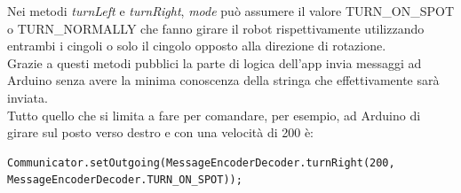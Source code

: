 Nei metodi \emph{turnLeft} e \emph{turnRight}, \emph{mode} può assumere il valore 
TURN\_ON\_SPOT o TURN\_NORMALLY che fanno girare il robot rispettivamente utilizzando 
entrambi i cingoli o solo il cingolo opposto alla direzione di rotazione.\\
Grazie a questi metodi pubblici la parte di logica dell'app invia messaggi ad Arduino
senza avere la minima conoscenza della stringa che effettivamente sarà inviata.\\
Tutto quello che si limita a fare per comandare, per esempio, ad Arduino di girare 
sul posto verso destro e con una velocità di 200 è:
\begin{lstlisting}[caption=Esempio di codifica e invio di un comando ad Arduino]
Communicator.setOutgoing(MessageEncoderDecoder.turnRight(200, MessageEncoderDecoder.TURN_ON_SPOT));
\end{lstlisting}

